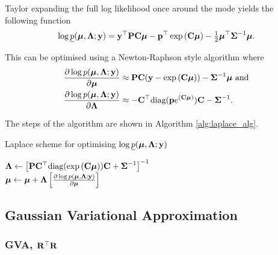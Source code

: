 \documentclass{article}[12pt]
\begin{document}
	
	Taylor expanding the full log likelihood once around the mode yields the following function
	\begin{align*}
		\log \underline{p}({\boldsymbol \mu}, {\boldsymbol \Lambda}; {\bf y}) = {\bf y}^\top{\bf P}{\bf C}{\boldsymbol\mu} - {\bf p}^\top\exp \left ({\bf C} {\boldsymbol \mu} \right ) - \tfrac{1}{2} {\boldsymbol \mu}^\top {\boldsymbol\Sigma}^{-1} {\boldsymbol \mu}. 
	\end{align*}
	
	This can be optimised using a Newton-Raphson style algorithm where
	\begin{align*}
		\frac{\partial \log p({\boldsymbol \mu}, {\boldsymbol \Lambda}; {\bf y})}{\partial {\boldsymbol\mu}}     & \approx {\bf P} {\bf C} ({\bf y} - \exp{({\bf C}{\boldsymbol\mu})}) - {\boldsymbol \Sigma}^{-1} {\boldsymbol \mu} \text{ and} \\
		\frac{\partial \log p({\boldsymbol \mu}, {\boldsymbol \Lambda}; {\bf y})}{\partial {\boldsymbol\Lambda}} & \approx - {\bf C}^\top \text{diag}({\bf p} e^{({\bf C} {\boldsymbol \mu})}) {\bf C} - {\boldsymbol \Sigma}^{-1}.   
	\end{align*}
	
	The steps of the algorithm are shown in Algorithm \ref{alg:laplace_alg}.
	
	\begin{algorithm}
		\caption{Laplace scheme for optimising $\log \underline{p}({\boldsymbol \mu}, {\boldsymbol \Lambda}; {\bf y})$}
		\label{alg:laplace_alg}
		\begin{algorithmic}
			\STATE ${\boldsymbol \Lambda} \leftarrow \left [{\bf P} {\bf C}^\top \text{diag}(\exp{({\bf C}{\boldsymbol\mu})}) {\bf C} + {\boldsymbol \Sigma}^{-1} \right ]^{-1}$ \\ [1ex] 
			\STATE ${\boldsymbol \mu} \leftarrow {\boldsymbol\mu} + {\boldsymbol \Lambda} \left [ \frac{\partial \log p({\boldsymbol \mu}, {\boldsymbol \Lambda}; {\bf y})}{\partial {\boldsymbol\mu}} \right ]$ \\ [1ex]
			\ENDWHILE
		\end{algorithmic}
	\end{algorithm}
	
	\subsection{Gaussian Variational Approximation}
	
	
	\subsubsection{GVA, ${\bf R}^\top {\bf R}$}
	
\end{document}

